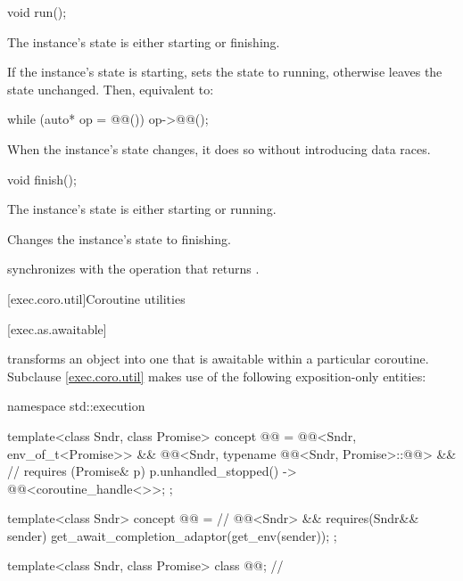 %
\begin{itemdecl}
void run();
\end{itemdecl}

\begin{itemdescr}
\pnum
\expects
The  instance's state is either starting or finishing.

\pnum
\effects
If the  instance's state is starting,
sets the state to running,
otherwise leaves the state unchanged.
Then, equivalent to:
\begin{codeblock}
while (auto* op = @@()) {
  op->@@();
}
\end{codeblock}

\pnum
\remarks
When the  instance's state changes,
it does so without introducing data races.
\end{itemdescr}

%
\begin{itemdecl}
void finish();
\end{itemdecl}

\begin{itemdescr}
\pnum
\expects
The  instance's state is either starting or running.

\pnum
\effects
Changes the  instance's state to finishing.

\pnum
\sync
{} synchronizes with the  operation
that returns .
\end{itemdescr}

[exec.coro.util]{Coroutine utilities}

[exec.as.awaitable]{}

\pnum
{} transforms an object into one
that is awaitable within a particular coroutine.
Subclause \ref{exec.coro.util} makes use of
the following exposition-only entities:
\begin{codeblock}
namespace std::execution {
  template<class Sndr, class Promise>
    concept @@ =
      @@<Sndr, env_of_t<Promise>> &&
      @@<Sndr,
                typename @@<Sndr, Promise>::@@> &&    // \seebelow
      requires (Promise& p) {
        { p.unhandled_stopped() } -> @@<coroutine_handle<>>;
      };

  template<class Sndr>
    concept @@ =            // \expos
      @@<Sndr> &&
      requires(Sndr&& sender) {
        get_await_completion_adaptor(get_env(sender));
      };

  template<class Sndr, class Promise>
    class @@;                                     // \expos
}
\end{codeblock}

